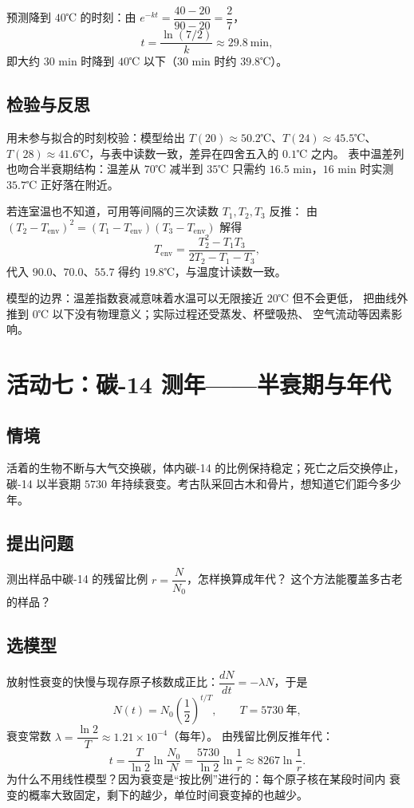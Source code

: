 预测降到 $40$℃ 的时刻：由 $e^{-kt}=\dfrac{40-20}{90-20}=\dfrac{2}{7}$，
\[
  t=\frac{\ln(7/2)}{k}\approx29.8\ \text{min},
\]
即大约 $30$ min 时降到 $40$℃ 以下（$30$ min 时约 $39.8$℃）。

\subsection{检验与反思}
用未参与拟合的时刻校验：模型给出 $T(20)\approx50.2$℃、$T(24)\approx45.5$℃、
$T(28)\approx41.6$℃，与表中读数一致，差异在四舍五入的 $0.1$℃ 之内。
表中温差列也吻合半衰期结构：温差从 $70$℃ 减半到 $35$℃ 只需约
$16.5$ min，$16$ min 时实测 $35.7$℃ 正好落在附近。

若连室温也不知道，可用等间隔的三次读数 $T_1,T_2,T_3$ 反推：
由 $(T_2-T_{\text{env}})^2=(T_1-T_{\text{env}})(T_3-T_{\text{env}})$ 解得
\[
  T_{\text{env}}=\frac{T_2^2-T_1T_3}{2T_2-T_1-T_3},
\]
代入 $90.0$、$70.0$、$55.7$ 得约 $19.8$℃，与温度计读数一致。

模型的边界：温差指数衰减意味着水温可以无限接近 $20$℃ 但不会更低，
把曲线外推到 $0$℃ 以下没有物理意义；实际过程还受蒸发、杯壁吸热、
空气流动等因素影响。

\section{活动七：碳-14 测年——半衰期与年代}

\subsection{情境}
活着的生物不断与大气交换碳，体内碳-14 的比例保持稳定；死亡之后交换停止，
碳-14 以半衰期 $5730$ 年持续衰变。考古队采回古木和骨片，想知道它们距今多少年。

\subsection{提出问题}
测出样品中碳-14 的残留比例 $r=\dfrac{N}{N_0}$，怎样换算成年代？
这个方法能覆盖多古老的样品？

\subsection{选模型}
放射性衰变的快慢与现存原子核数成正比：$\dfrac{dN}{dt}=-\lambda N$，于是
\[
  N(t)=N_0\left(\frac{1}{2}\right)^{t/T},\qquad T=5730\ \text{年},
\]
衰变常数 $\lambda=\dfrac{\ln2}{T}\approx1.21\times10^{-4}$（每年）。
由残留比例反推年代：
\[
  t=\frac{T}{\ln2}\ln\frac{N_0}{N}=\frac{5730}{\ln2}\ln\frac{1}{r}
  \approx8267\ln\frac{1}{r}.
\]
为什么不用线性模型？因为衰变是“按比例”进行的：每个原子核在某段时间内
衰变的概率大致固定，剩下的越少，单位时间衰变掉的也越少。

